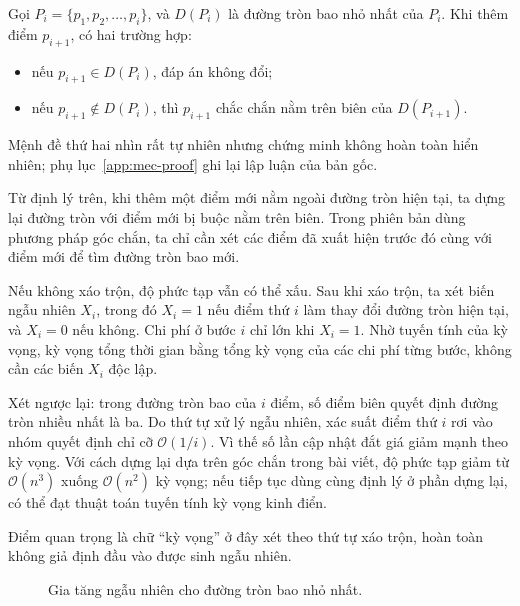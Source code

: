 \documentclass[11pt]{article}
\newcommand{\Oh}{\mathcal{O}}
\begin{document}
Gọi \(P_i=\{p_1,p_2,\ldots,p_i\}\), và \(D(P_i)\) là đường tròn bao nhỏ nhất
của \(P_i\). Khi thêm điểm \(p_{i+1}\), có hai trường hợp:
\begin{itemize}
  \item nếu \(p_{i+1}\in D(P_i)\), đáp án không đổi;
  \item nếu \(p_{i+1}\notin D(P_i)\), thì \(p_{i+1}\) chắc chắn nằm trên biên
  của \(D(P_{i+1})\).
\end{itemize}
Mệnh đề thứ hai nhìn rất tự nhiên nhưng chứng minh không hoàn toàn hiển nhiên;
phụ lục~\ref{app:mec-proof} ghi lại lập luận của bản gốc.

Từ định lý trên, khi thêm một điểm mới nằm ngoài đường tròn hiện tại, ta dựng
lại đường tròn với điểm mới bị buộc nằm trên biên. Trong phiên bản dùng phương
pháp góc chắn, ta chỉ cần xét các điểm đã xuất hiện trước đó cùng với điểm mới
để tìm đường tròn bao mới.

Nếu không xáo trộn, độ phức tạp vẫn có thể xấu. Sau khi xáo trộn, ta xét biến
ngẫu nhiên \(X_i\), trong đó \(X_i=1\) nếu điểm thứ \(i\) làm thay đổi đường
tròn hiện tại, và \(X_i=0\) nếu không. Chi phí ở bước \(i\) chỉ lớn khi
\(X_i=1\). Nhờ tuyến tính của kỳ vọng, kỳ vọng tổng thời gian bằng tổng kỳ
vọng của các chi phí từng bước, không cần các biến \(X_i\) độc lập.

Xét ngược lại: trong đường tròn bao của \(i\) điểm, số điểm biên quyết định
đường tròn nhiều nhất là ba. Do thứ tự xử lý ngẫu nhiên, xác suất điểm thứ
\(i\) rơi vào nhóm quyết định chỉ cỡ \(\Oh(1/i)\). Vì thế số lần cập nhật đắt
giá giảm mạnh theo kỳ vọng. Với cách dựng lại dựa trên góc chắn trong bài
viết, độ phức tạp giảm từ \(\Oh(n^3)\) xuống \(\Oh(n^2)\) kỳ vọng; nếu tiếp
tục dùng cùng định lý ở phần dựng lại, có thể đạt thuật toán tuyến tính kỳ
vọng kinh điển.

Điểm quan trọng là chữ ``kỳ vọng'' ở đây xét theo thứ tự xáo trộn, hoàn toàn
không giả định đầu vào được sinh ngẫu nhiên.

\begin{figure}[htbp]
\centering
{}
\caption{Gia tăng ngẫu nhiên cho đường tròn bao nhỏ nhất.}
\end{figure}
\end{document}
